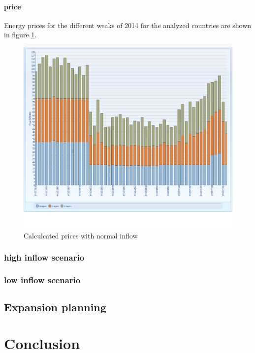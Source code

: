 \documentclass{article}
\begin{document}
\paragraph{price\\}
Energy prices for the different weaks of 2014 for the analyzed countries are shown in figure \ref{fig:MTpricesnormal}.
\begin{figure}[htbp]
\begin{center}
\includegraphics[width=14cm,keepaspectratio=true]{figures/MTprices}
\caption{Calculcated prices with normal inflow}
\label{fig:MTpricesnormal}
\end{center}
\end{figure}
\subsubsection{high inflow scenario}
\subsubsection{low inflow scenario}
\subsection{Expansion planning}
\newpage
\section{Conclusion}
\end{document}
